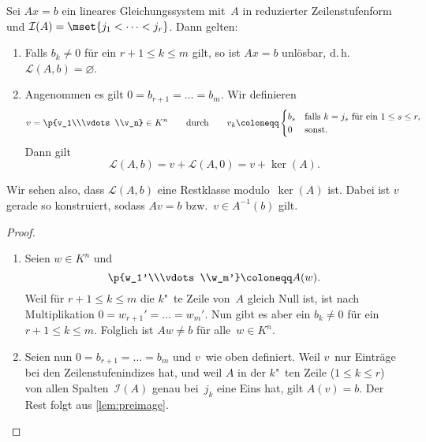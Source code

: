 \documentclass[a4paper]{article}
\begin{document}
\begin{theorem}
    Sei $Ax = b$ ein lineares Gleichungssystem mit~$A$ in reduzierter Zeilenstufenform und $\mathcal{I}(A) = \mset{j_1 < \dots < j_r}$. Dann gelten:
    \begin{enumerate}
        \item Falls $b_k \neq 0$ für ein $r+1 \leq k \leq m$ gilt, so ist $Ax = b$ unlösbar, d.\,h.\ $\mathcal{L}(A,b) = \varnothing$.
        \item Angenommen es gilt $0 = b_{r+1} = \dots = b_m$. Wir definieren
              \begin{equation*}
                  v = \p{v_1\\\vdots\\v_n} \in K^n \qquad\text{durch}\qquad v_k \coloneqq \begin{cases}
                      b_s & \text{falls } k = j_s \text{ für ein } 1 \leq s \leq r, \\
                      0   & \text{sonst}.
                  \end{cases}
              \end{equation*}
              Dann gilt
              \begin{equation*}
                  \mathcal{L}(A,b) = v+\mathcal{L}(A,0) = v+\ker(A).
              \end{equation*}
    \end{enumerate}
\end{theorem}

Wir sehen also, dass $\mathcal{L}(A,b)$ eine Restklasse modulo~$\ker(A)$ ist. Dabei ist $v$ gerade so konstruiert, sodass $Av = b$ bzw.\ $v \in A^{-1}(b)$ gilt.

\begin{proof}\leavevmode
    \begin{enumerate}
        \item Seien $w \in K^n$ und
              \begin{equation*}
                  \p{w_1'\\\vdots\\w_m'} \coloneqq A(w).
              \end{equation*}
              Weil für $r+1 \leq k \leq m$ die $k$"~te Zeile von~$A$ gleich Null ist, ist nach Multiplikation $0 = w_{r+1}' = \dots = w_m'$. Nun gibt es aber ein $b_k \neq 0$ für ein $r+1 \leq k \leq m$. Folglich ist $Aw \neq b$ für alle~$w \in K^n$.
        \item Seien nun $0 = b_{r+1} = \dots = b_m$ und $v$~wie oben definiert. Weil $v$~nur Einträge bei den Zeilenstufenindizes hat, und weil $A$ in der $k$"~ten Zeile ($1 \leq k \leq r$) von allen Spalten~$\mathcal{I}(A)$ genau bei~$j_k$ eine Eins hat, gilt $A(v) = b$. Der Rest folgt aus \cref{lem:preimage}.\qedhere
    \end{enumerate}
\end{proof}
\end{document}
